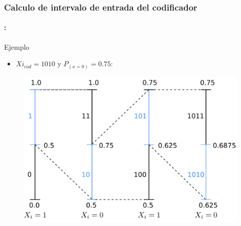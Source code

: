 \begin{frame}
  \frametitle{\textbf{Calculo de intervalo de entrada del  codificador}}
\framesubtitle{\secname : \subsecname}
   \begin{block}{Ejemplo}
   \begin{itemize}
    \item $Xi_{cod} = 1010$ y $P_{(x=0)}=0.75$: 
  \end{itemize}
  \end{block}
      \vspace{-0.3cm}
  \begin{figure}[!t] \centering
  \includegraphics[width=0.80\paperheight]{Diagramas/int_ent_cod.png}%
  \end{figure}
\end{frame}

